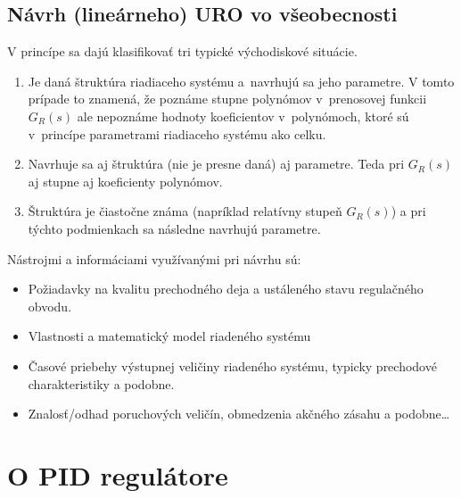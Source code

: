 \documentclass[a4paper, 10pt, ]{article}
\begin{document}
\subsection{Návrh (lineárneho) URO vo všeobecnosti}

V princípe sa dajú klasifikovať tri typické východiskové situácie.

\begin{enumerate}[leftmargin=0pt, labelsep=4mm, itemsep=0pt]
    \item Je daná štruktúra riadiaceho systému a~navrhujú sa jeho parametre. \newline V tomto prípade to znamená, že poznáme stupne polynómov v~prenosovej funkcii $G_R(s)$ ale nepoznáme hodnoty koeficientov v~polynómoch, ktoré sú v~princípe parametrami riadiaceho systému ako celku.

    \item Navrhuje sa aj štruktúra (nie je presne daná) aj parametre. \newline Teda pri $G_R(s)$ aj stupne aj koeficienty polynómov.

    \item Štruktúra je čiastočne známa (napríklad relatívny stupeň $G_R(s)$) a pri týchto podmienkach sa následne navrhujú parametre.

\end{enumerate}

\noindent
Nástrojmi a informáciami využívanými pri návrhu sú:

\begin{itemize}[leftmargin=0pt, labelsep=4mm, itemsep=0pt]

    \item Požiadavky na kvalitu prechodného deja a ustáleného stavu regulačného obvodu.

    \item Vlastnosti a matematický model riadeného systému

    \item Časové priebehy výstupnej veličiny riadeného systému, typicky prechodové charakteristiky a podobne.

    \item Znalosť/odhad poruchových veličín, obmedzenia akčného zásahu a podobne\ldots
\end{itemize}




\section{O PID regulátore}
\end{document}
